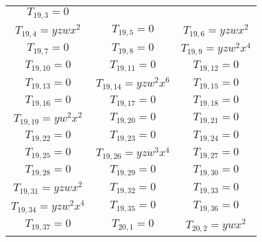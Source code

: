 \documentclass[12pt]{memoireuqam1.3}
\begin{document}
\begin{longtable}{|c|c|c|}
$T_{19,3}= 0$\\

$T_{19,4}= yzwx^2$&

$T_{19,5}= 0$&

$T_{19,6}= yzwx^2$\\

$T_{19,7}= 0$&

$T_{19,8}= 0$&

$T_{19,9}= yzw^2x^4$\\

$T_{19,10}= 0$&

$T_{19,11}= 0$&

$T_{19,12}= 0$\\

$T_{19,13}= 0$&

$T_{19,14}= yzw^2x^6$&

$T_{19,15}= 0$\\

$T_{19,16}= 0$&

$T_{19,17}= 0$&

$T_{19,18}= 0$\\

$T_{19,19}= yw^2x^2$&

$T_{19,20}= 0$&

$T_{19,21}= 0$\\

$T_{19,22}= 0$&

$T_{19,23}= 0$&

$T_{19,24}= 0$\\

$T_{19,25}= 0$&

$T_{19,26}= yzw^3x^4$&

$T_{19,27}= 0$\\

$T_{19,28}= 0$&

$T_{19,29}= 0$&

$T_{19,30}= 0$\\

$T_{19,31}= yzwx^2$&

$T_{19,32}= 0$&

$T_{19,33}= 0$\\

$T_{19,34}= yzw^2x^4$&

$T_{19,35}= 0$&

$T_{19,36}= 0$\\

$T_{19,37}= 0$&

$T_{20,1}= 0$&

$T_{20,2}= ywx^2$\\


\end{longtable}
\end{document}
